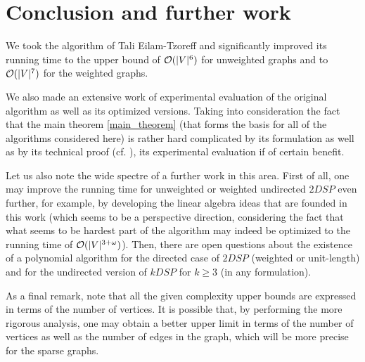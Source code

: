 \section{Conclusion and further work}

We took the algorithm of Tali Eilam-Tzoreff and significantly improved its running time to the upper bound of $\mathcal{O}(|V|^6)$ for unweighted graphs and to $\mathcal{O}(|V|^7)$ for the weighted graphs. 

We also made an extensive work of experimental evaluation of the original algorithm as well as its optimized versions. Taking into consideration the fact that the main theorem \ref{main_theorem} (that forms the basis for all of the algorithms considered here) is rather hard complicated by its formulation as well as by its technical proof (cf. \cite{ET}), its experimental evaluation if of certain benefit.

Let us also note the wide spectre of a further work in this area. First of all, one may improve the running time for unweighted or weighted undirected $2DSP$ even further, for example, by developing the linear algebra ideas that are founded in this work (which seems to be a perspective direction, considering the fact that what seems to be hardest part of the algorithm may indeed be optimized to the running time of $\mathcal{O}(|V|^{3 + \omega})$). Then, there are open questions about the existence of a polynomial algorithm for the directed case of $2DSP$ (weighted or unit-length) and for the undirected version of $kDSP$ for $k \geq 3$ (in any formulation). 

As a final remark, note that all the given complexity upper bounds are expressed in terms of the number of vertices. It is possible that, by performing the more rigorous analysis, one may obtain a better upper limit in terms of the number of vertices as well as the number of edges in the graph, which will be more precise for the sparse graphs. 
